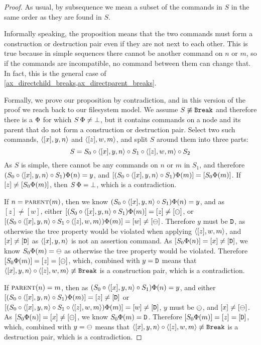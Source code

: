 \begin{proof}
As usual, by subsequence we mean a subset of the commands in $S$ in the same order as they are found in $S$.

Informally speaking, the proposition means that
the two commands must form a construction or destruction pair even
if they are not next to each other.
This is true because in simple sequences
there cannot be another command on $n$ or $m$,
so if the commands are incompatible, no command between them can change that.
In fact, this  is the general case
of \cref{ax_directchild_breaks,ax_directparent_breaks}.

Formally, we prove our proposition by contradiction,
and in this version of the proof we reach back to our filesystem model.
We assume $S\not\equiv\mathtt{Break}$ and therefore there is a $\Phi$ for which $S\,\Phi\neq\bot$,
but it contains commands on a node and its parent that do not form a construction or destruction pair.
Select two such commands, $\langle{[x],y,n}\rangle$ and $\langle{[z],w,m}\rangle$,
and split $S$ around them into three parts:
\[ S = S_0 \circ \langle{[x],y,n}\rangle \circ S_1 \circ \langle{[z],w,m}\rangle \circ S_2 \]
As $S$ is simple, there cannot be any commands on $n$ or $m$ in $S_1$,
and therefore $(S_0\circ\langle{[x],y,n}\rangle\circ S_1)\Phi(n) = y$,
and $[(S_0\circ\langle{[x],y,n}\rangle\circ S_1)\Phi(m)] = [S_0\Phi(m)]$.
If $[z]\neq[S_0\Phi(m)]$, then $S\,\Phi=\bot$, which is a contradiction.

If $n=\text{\normalfont\scshape{parent}}(m)$, then 
we know $(S_0\circ\langle{[x],y,n}\rangle\circ S_1)\Phi(n) = y$, and as $[z]\neq[w]$, either
$[(S_0\circ\langle{[x],y,n}\rangle\circ S_1)\Phi(m)]=[z]\neq[\ominus]$,
or $[(S_0\circ\langle{[x],y,n}\rangle\circ S_1\circ\langle{[z],w,m}\rangle)\Phi(m)]=[w]\neq[\ominus]$.
Therefore $y$ must be $\mathtt{D}$, as otherwise the tree property would be violated
when applying $\langle{[z],w,m}\rangle$,
and $[x]\neq[\mathtt{D}]$ as $\langle{[x],y,n}\rangle$ is not an assertion command.
As $[S_0\Phi(n)]=[x]\neq[\mathtt{D}]$, we know
$S_0\Phi(m)=\ominus$ as otherwise the tree property would be violated.
Therefore $[S_0\Phi(m)]=[z]=[\ominus]$, which, combined with $y=\mathtt{D}$
means that $\langle{[x],y,n}\rangle\circ\langle{[z],w,m}\rangle\not\equiv\mathtt{Break}$ is a construction pair, which is a contradiction.

If $\text{\normalfont\scshape{parent}}(n)=m$, then 
as $(S_0\circ\langle{[x],y,n}\rangle\circ S_1)\Phi(n) = y$, and either
$[(S_0\circ\langle{[x],y,n}\rangle\circ S_1)\Phi(m)]=[z]\neq[\mathtt{D}]$
or $[(S_0\circ\langle{[x],y,n}\rangle\circ S_1\circ\langle{[z],w,m}\rangle)\Phi(m)]=[w]\neq[\mathtt{D}]$,
$y$ must be $\ominus$, and $[x]\neq[\ominus]$.
As $[S_0\Phi(n)]=[x]\neq[\ominus]$, we know $S_0\Phi(m)=\mathtt{D}$.
Therefore $[S_0\Phi(m)]=[z]=[\mathtt{D}]$, which, combined with $y=\ominus$
means that $\langle{[x],y,n}\rangle\circ\langle{[z],w,m}\rangle\not\equiv\mathtt{Break}$ is a destruction pair, which is a contradiction.
\end{proof}


